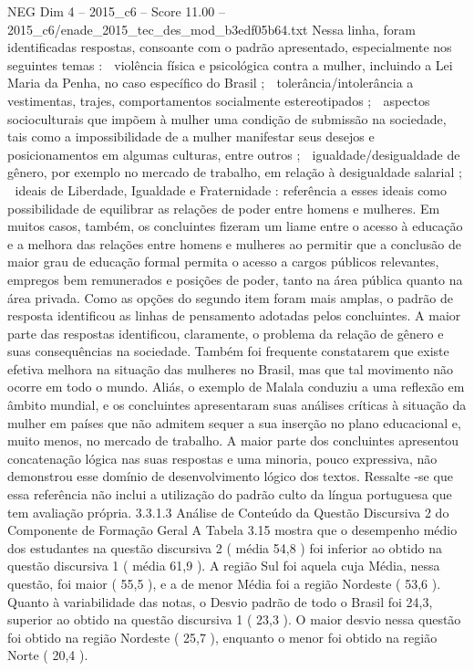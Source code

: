 \begin{textsample}{NEG Dim 4 – 2015\_c6 – Score 11.00 – 2015\_c6/enade\_2015\_tec\_des\_mod\_b3edf05b64.txt}
Nessa linha, foram identificadas respostas, consoante com o padrão apresentado, especialmente nos seguintes temas :  violência física e psicológica contra a mulher, incluindo a Lei Maria da Penha, no caso específico do Brasil ;  tolerância/intolerância a vestimentas, trajes, comportamentos socialmente estereotipados ;  aspectos socioculturais que impõem à mulher uma condição de submissão na sociedade, tais como a impossibilidade de a mulher manifestar seus desejos e posicionamentos em algumas culturas, entre outros ;  igualdade/desigualdade de gênero, por exemplo no mercado de trabalho, em relação à desigualdade salarial ;  ideais de Liberdade, Igualdade e Fraternidade : referência a esses ideais como possibilidade de equilibrar as relações de poder entre homens e mulheres.
Em muitos casos, também, os concluintes fizeram um liame entre o acesso à educação e a melhora das relações entre homens e mulheres ao permitir que a conclusão de maior grau de educação formal permita o acesso a cargos públicos relevantes, empregos bem remunerados e posições de poder, tanto na área pública quanto na área privada.
Como as opções do segundo item foram mais amplas, o padrão de resposta identificou as linhas de pensamento adotadas pelos concluintes.
A maior parte das respostas identificou, claramente, o problema da relação de gênero e suas consequências na sociedade.
Também foi frequente constatarem que existe efetiva melhora na situação das mulheres no Brasil, mas que tal movimento não ocorre em todo o mundo.
Aliás, o exemplo de Malala conduziu a uma reflexão em âmbito mundial, e os concluintes apresentaram suas análises críticas à situação da mulher em países que não admitem sequer a sua inserção no plano educacional e, muito menos, no mercado de trabalho.
A maior parte dos concluintes apresentou concatenação lógica nas suas respostas e uma minoria, pouco expressiva, não demonstrou esse domínio de desenvolvimento lógico dos textos.
Ressalte -se que essa referência não inclui a utilização do padrão culto da língua portuguesa que tem avaliação própria. 3.3.1.3 Análise de Conteúdo da Questão Discursiva 2 do Componente de Formação Geral A Tabela 3.15 mostra que o desempenho médio dos estudantes na questão discursiva 2 ( média 54,8 ) foi inferior ao obtido na questão discursiva 1 ( média 61,9 ).
A região Sul foi aquela cuja Média, nessa questão, foi maior ( 55,5 ), e a de menor Média foi a região Nordeste ( 53,6 ).
Quanto à variabilidade das notas, o Desvio padrão de todo o Brasil foi 24,3, superior ao obtido na questão discursiva 1 ( 23,3 ).
O maior desvio nessa questão foi obtido na região Nordeste ( 25,7 ), enquanto o menor foi obtido na região Norte ( 20,4 ).

\end{textsample}
